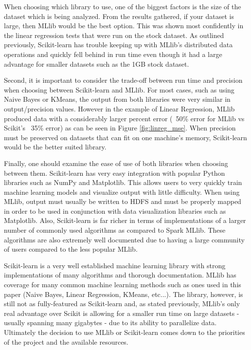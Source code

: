 \documentclass[9pt,twocolumn,twoside]{idsi}
\begin{document}
When choosing which library to use, one of the biggest factors is the size of the dataset which is being analyzed. From the results gathered, if your dataset is large, then MLlib would be the best option. 
This was shown most confidently in the linear regression tests that were run on the stock dataset. As outlined previously, Scikit-learn has trouble keeping up with MLlib's distributed data operations and quickly fell behind in run time even though it had a large advantage for smaller datasets such as the 1GB stock dataset.

Second, it is important to consider the trade-off between run time and precision when choosing between Scikit-learn and MLlib. For most cases, such as using Naive Bayes or KMeans, the output from both libraries were very similar in output/precision values. However in the example of Linear Regression, MLlib produced data with a considerably larger percent error (~50\% error for MLlib vs Scikit's ~35\% error) as can be seen in Figure \ref{fig:linreg_mse}. When precision must be preserved on datasets that can fit on one machine's memory, Scikit-learn would be the better suited library.

Finally, one should examine the ease of use of both libraries when choosing between them. Scikit-learn has very easy integration with popular Python libraries such as NumPy and Matplotlib. This allows users to very quickly train machine learning models and visualize output with little difficulty. When using MLlib, output must usually be written to HDFS and must be properly mapped in order to be used in conjunction with data visualization libraries such as Matplotlib. Also, Scikit-learn is far richer in terms of implementations of a larger number of commonly used algorithms as compared to Spark MLlib. These algorithms are also extremely well documented due to having a large community of users compared to the less popular MLlib.

Scikit-learn is a very well established machine learning library with strong implementations of many algorithms and thorough documentation. MLlib has coverage for many common machine learning methods such as ones used in this paper (Naive Bayes, Linear Regression, KMeans, etc...). The library, however, is still not as fully-featured as Scikit-learn and, as stated previously, MLlib's only real advantage over Scikit is allowing for a smaller run time on large datasets - usually spanning many gigabytes - due to its ability to parallelize data. Ultimately the decision to use MLlib or Scikit-learn comes down to the priorities of the project and the available resources.
\end{document}

